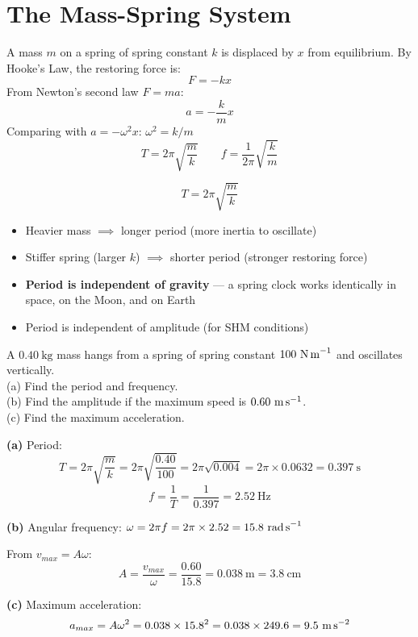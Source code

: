 \section{The Mass-Spring System}

\begin{processbox}
A mass $m$ on a spring of spring constant $k$ is
displaced by $x$ from equilibrium. By Hooke's Law,
the restoring force is:
\[
  F = -kx
\]
From Newton's second law $F = ma$:
\[
  a = -\frac{k}{m}x
\]
Comparing with $a = -\omega^2 x$: $\omega^2 = k/m$
\[
  \boxed{T = 2\pi\sqrt{\frac{m}{k}}}
  \qquad
  f = \frac{1}{2\pi}\sqrt{\frac{k}{m}}
\]
\end{processbox}

\begin{keybox}
\[
  T = 2\pi\sqrt{\frac{m}{k}}
\]
\begin{itemize}[noitemsep]
  \item Heavier mass $\implies$ longer period (more
  inertia to oscillate)
  \item Stiffer spring (larger $k$) $\implies$ shorter
  period (stronger restoring force)
  \item \textbf{Period is independent of gravity} ---
  a spring clock works identically in space, on the
  Moon, and on Earth
  \item Period is independent of amplitude (for SHM
  conditions)
\end{itemize}
\end{keybox}

\begin{examplebox}[7.3]
A $0.40\ \text{kg}$ mass hangs from a spring of
spring constant $100\ \text{N\,m}^{-1}$ and oscillates
vertically.\\
(a) Find the period and frequency.\\
(b) Find the amplitude if the maximum speed is
$0.60\ \text{m\,s}^{-1}$.\\
(c) Find the maximum acceleration.
\end{examplebox}

\begin{solutionbox}
\textbf{(a)} Period:
\[
  T = 2\pi\sqrt{\frac{m}{k}}
  = 2\pi\sqrt{\frac{0.40}{100}}
  = 2\pi\sqrt{0.004}
  = 2\pi \times 0.0632
  = 0.397\ \text{s}
\]
\[
  f = \frac{1}{T} = \frac{1}{0.397} = 2.52\ \text{Hz}
\]

\textbf{(b)} Angular frequency:
$\omega = 2\pi f = 2\pi \times 2.52 = 15.8\ \text{rad\,s}^{-1}$

From $v_{max} = A\omega$:
\[
  A = \frac{v_{max}}{\omega} = \frac{0.60}{15.8}
  = 0.038\ \text{m} = 3.8\ \text{cm}
\]

\textbf{(c)} Maximum acceleration:
\[
  a_{max} = A\omega^2 = 0.038 \times 15.8^2
  = 0.038 \times 249.6
  = 9.5\ \text{m\,s}^{-2}
\]
\end{solutionbox}


